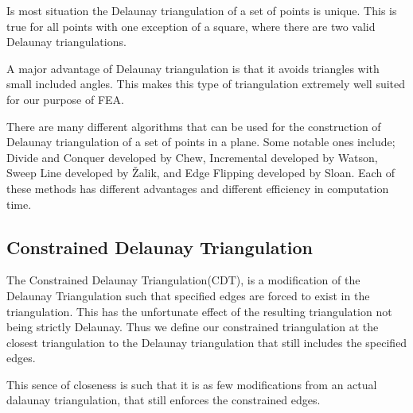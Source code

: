 \documentclass[../fem.tex]{subfiles}
\begin{document}
\begin{Figure}
   \begin{center}
     
   \end{center}
\end{Figure}

Is most situation the Delaunay triangulation of a set of points is unique. This
is true for all points with one exception of a square, where there are two
valid Delaunay triangulations.

A major advantage of Delaunay triangulation is that it avoids triangles with
small included angles. This makes this type of triangulation extremely well
suited for our purpose of FEA.

There are many different algorithms that can be used for the construction of
Delaunay triangulation of a set of points in a plane. Some notable ones
include; Divide and Conquer developed by Chew\cite{C_CDT}, Incremental
developed by Watson, Sweep Line developed by \v{Z}alik\cite{Z_DT}\cite{DZ_CDT},
and Edge Flipping developed by Sloan\cite{S_DT}\cite{S_CDT}. Each of these
methods has different advantages and different efficiency in computation time.

\subsection{Constrained Delaunay Triangulation}%
\label{sub:constrained_delaunay_triangulation}

The Constrained Delaunay Triangulation(CDT), is a modification of the Delaunay
Triangulation such that specified edges are forced to exist in the
triangulation. This has the unfortunate effect of the resulting triangulation
not being strictly Delaunay. Thus we define our constrained triangulation at
the closest triangulation to the Delaunay triangulation that still includes the
specified edges.

This sence of closeness is such that it is as few modifications from an actual
dalaunay triangulation, that still enforces the constrained edges.

\begin{Figure}
  \begin{center}
    
  \end{center}
\end{Figure}
\end{document}

